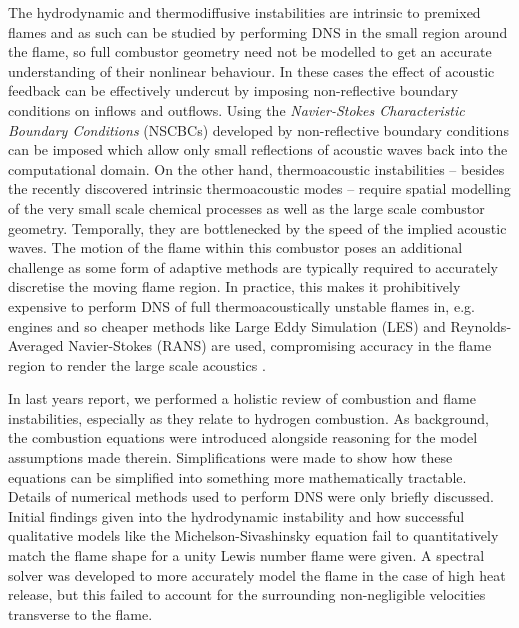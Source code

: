 The hydrodynamic and thermodiffusive instabilities are intrinsic to premixed flames and as such can be studied by performing DNS in the small region around the flame, so full combustor geometry need not be modelled to get an accurate understanding of their nonlinear behaviour. In these cases the effect of acoustic feedback can be effectively undercut by imposing non-reflective boundary conditions on inflows and outflows. Using the \emph{Navier-Stokes Characteristic Boundary Conditions} (NSCBCs) developed by \cite{thompson1990TimeDependentBoundaryConditions, poinsot1992BoundaryConditionsDirect, poinsot2001TheoreticalNumericalCombustion, sutherland2003ImprovedBoundaryConditions} non-reflective boundary conditions can be imposed which allow only small reflections of acoustic waves back into the computational domain. On the other hand, thermoacoustic instabilities -- besides the recently discovered intrinsic thermoacoustic modes \cite{silva2023IntrinsicThermoacousticInstabilities} -- require spatial modelling of the very small scale chemical processes as well as the large scale combustor geometry. Temporally, they are bottlenecked by the speed of the implied acoustic waves. The motion of the flame within this combustor poses an additional challenge as some form of adaptive methods are typically required to accurately discretise the moving flame region. In practice, this makes it prohibitively expensive to perform DNS of full thermoacoustically unstable flames in, e.g. engines and so cheaper methods like Large Eddy Simulation (LES) and Reynolds-Averaged Navier-Stokes (RANS) are used, compromising accuracy in the flame region to render the large scale acoustics \cite{yang2015LargeEddySimulationPresent, domingo2023RecentDevelopmentsDNS}.

In last years report, we performed a holistic review of combustion and flame instabilities, especially as they relate to hydrogen combustion. As background, the combustion equations were introduced alongside reasoning for the model assumptions made therein. Simplifications were made to show how these equations can be simplified into something more mathematically tractable. Details of numerical methods used to perform DNS were only briefly discussed. Initial findings given into the hydrodynamic instability and how successful qualitative models like the Michelson-Sivashinsky equation \cite{sivashinsky1977NonlinearAnalysisHydrodynamic, michelson1977NonlinearAnalysisHydrodynamic} fail to quantitatively match the flame shape for a unity Lewis number flame were given. A spectral solver was developed to more accurately model the flame in the case of high heat release, but this failed to account for the surrounding non-negligible velocities transverse to the flame.

